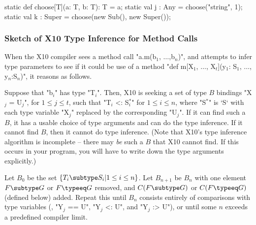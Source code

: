 {%
\begin{xten}
  static def choose[T](a: T, b: T): T = a; 
  static val j : Any = choose("string", 1);
  static val k : Super = choose(new Sub(), new Super());
\end{xten}


\subsubsection{Sketch of X10 Type Inference for Method Calls}

When the X10 compiler sees a method call 
\xcdmath"a.m(b$_1$, $\ldots$,b$_n$)", and attempts to infer type parameters to see if it could be use of a
method \xcdmath"def m[X$_1$, $\ldots$, X$_t$](y$_1$: S$_1$, $\ldots$, y$_n$:S$_n$)", 
it reasons as follows. 



Suppose that \xcdmath"b$_i$" has type \xcdmath"T$_i$".  Then, X10 is seeking a
set of type {$B$} bindings \xcdmath"X$_j$ = U$_j$", for $1 \le j \le t$, such that 
\xcdmath"T$_i$ <: S$^*_i$" for {$1 \le i \le n$}, where \xcdmath"S$^*$" is
\xcd`S` with each type variable \xcdmath"X$_j$" replaced by the corresponding
\xcdmath"U$_j$".  If it can find such a {$B$}, it has a usable choice of type
arguments and can do the type inference.  If it cannot find {$B$}, then it
cannot do type inference.    (Note that X10's type inference algorithm is
incomplete -- there may {\em be} such a {$B$} that X10 cannot find.  If this
occurs in your program, you will have to write down the type arguments
explicitly.) 

Let $B_0$ be the set {$\{ T_i \subtype S_i | 1 \le i \le n\}$}.  Let
{$B_{n+1}$} be {$B_n$} with one element {$F \subtype G$} or 
{$F \typeeq G$} removed, and
{$C(F \subtype G)$} 
or {$C(F \typeeq G)$} (defined below) added.  Repeat this until 
{$B_n$} consists entirely of comparisons with type variables (\viz, 
\xcdmath"Y$_j$ == U", 
\xcdmath"Y$_j$ <: U", and
\xcdmath"Y$_j$ :> U"), 
or until some {$n$} exceeds a predefined compiler limit. 

}
